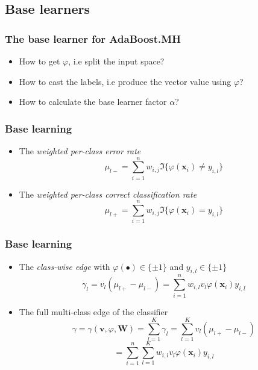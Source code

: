 \documentclass{beamer}
\begin{document}
\subsection{Base learners}

\begin{frame}
\frametitle{The base learner for AdaBoost.MH}
\begin{itemize}
\item How to get $\varphi$, i.e split the input space?
\item How to cast the labels, i.e produce the vector value using  $\varphi$?
\item How to calculate the base learner factor $\alpha$?
\end{itemize}
\end{frame}

\begin{frame}
\frametitle{Base learning}
\begin{itemize}
\item The \textit{weighted per-class error rate}
$$\mu_{l-} = \sum_{i=1}^{n}w_{i,j}\mathfrak{I}\{\varphi(\mathbf{x}_i) \neq y_{i,l}\}$$
\item The \textit{weighted per-class correct classification rate}
$$\mu_{l+} = \sum_{i=1}^{n}w_{i,j}\mathfrak{I}\{\varphi(\mathbf{x}_i) = y_{i,l}\}$$
\end{itemize}
\end{frame}

\begin{frame}
\frametitle{Base learning}
\begin{itemize}
\item The \textit{class-wise edge} with $\varphi(\bullet) \in \{\pm 1\}$ and $y_{i,l} \in \{\pm 1\}$
$$\gamma_l = v_l (\mu_{l+} - \mu_{l-}) = \sum_{i=1}^{n} w_{i,l} v_l \varphi(\mathbf{x}_i) y_{i,l}$$
\item The full multi-class edge of the classifier
$$\gamma = \gamma(\mathbf{v}, \varphi, \mathbf{W}) = \sum_{l=1}^{K} \gamma_l = \sum_{l=1}^{K} v_l(\mu_{l+} - \mu_{l-})$$
$$= \sum_{i=1}^{n} \sum_{l=1}^{K} w_{i,l} v_l \varphi(\mathbf{x}_i) y_{i,l} $$
\end{itemize}
\end{frame}
\end{document}
